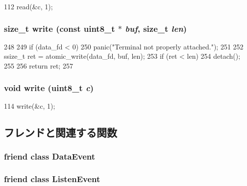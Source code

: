\begin{DoxyCode}
112 { read(&c, 1); }
\end{DoxyCode}
\hypertarget{classTerminal_a215d71301eb6ae0ebffc5d2f8fe4a140}{
\subsubsection[{write}]{\setlength{\rightskip}{0pt plus 5cm}size\_\-t write (const uint8\_\-t $\ast$ {\em buf}, \/  size\_\-t {\em len})}}
\label{classTerminal_a215d71301eb6ae0ebffc5d2f8fe4a140}



\begin{DoxyCode}
248 {
249     if (data_fd < 0)
250         panic("Terminal not properly attached.\n");
251 
252     ssize_t ret = atomic_write(data_fd, buf, len);
253     if (ret < len)
254         detach();
255 
256     return ret;
257 }
\end{DoxyCode}
\hypertarget{classTerminal_ada436a4b74c69ffbd4dc02b4b03d2cd3}{
\subsubsection[{write}]{\setlength{\rightskip}{0pt plus 5cm}void write (uint8\_\-t {\em c})}}
\label{classTerminal_ada436a4b74c69ffbd4dc02b4b03d2cd3}



\begin{DoxyCode}
114 { write(&c, 1); }
\end{DoxyCode}


\subsection{フレンドと関連する関数}
\hypertarget{classTerminal_a8a93830b802d4fc8562fa54ead43b1f9}{
\subsubsection[{DataEvent}]{\setlength{\rightskip}{0pt plus 5cm}friend class {\bf DataEvent}}}
\label{classTerminal_a8a93830b802d4fc8562fa54ead43b1f9}
\hypertarget{classTerminal_a9465cdda0008b0e7b7f9ac919cd9cca6}{
\subsubsection[{ListenEvent}]{\setlength{\rightskip}{0pt plus 5cm}friend class {\bf ListenEvent}}}
\label{classTerminal_a9465cdda0008b0e7b7f9ac919cd9cca6}


